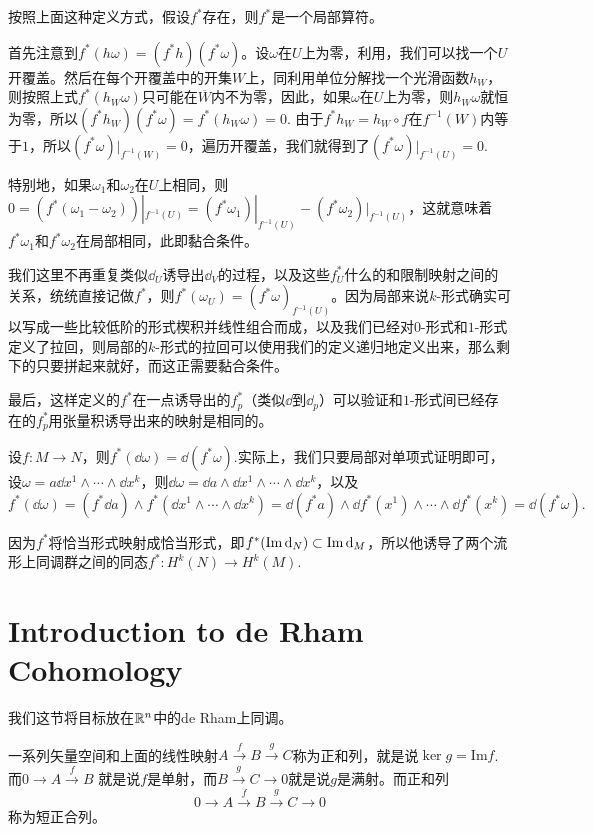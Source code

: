 \para 按照上面这种定义方式，假设$f^*$存在，则$f^*$是一个局部算符。

首先注意到$f^*(h\omega)=(f^*h)(f^*\omega)$。设$\omega$在$U$上为零，利用，我们可以找一个$U$开覆盖。然后在每个开覆盖中的开集$W$上，同利用单位分解找一个光滑函数$h_W$，则按照上式$f^*(h_W\omega)$只可能在$\overline{W}$内不为零，因此，如果$\omega$在$U$上为零，则$h_W\omega$就恒为零，所以$(f^*h_W)(f^*\omega)=f^*(h_W\omega)=0$. 由于$f^*h_W=h_W\circ f$在$f^{-1}(W)$内等于$1$，所以$(f^*\omega)|_{f^{-1}(W)}=0$，遍历开覆盖，我们就得到了$(f^*\omega)|_{f^{-1}(U)}=0$.

特别地，如果$\omega_1$和$\omega_2$在$U$上相同，则$0=(f^*(\omega_1-\omega_2))|_{f^{-1}(U)}=(f^*\omega_1)|_{f^{-1}(U)}-(f^*\omega_2)|_{f^{-1}(U)}$，这就意味着$f^*\omega_1$和$f^*\omega_2$在局部相同，此即黏合条件。

我们这里不再重复类似$\dd_U$诱导出$\dd_V$的过程，以及这些$f^*_U$什么的和限制映射之间的关系，统统直接记做$f^*$，则$f^*(\omega_{U})=(f^* \omega)_{f^{-1}(U)}$。因为局部来说$k$-形式确实可以写成一些比较低阶的形式楔积并线性组合而成，以及我们已经对$0$-形式和$1$-形式定义了拉回，则局部的$k$-形式的拉回可以使用我们的定义递归地定义出来，那么剩下的只要拼起来就好，而这正需要黏合条件。

最后，这样定义的$f^*$在一点诱导出的$f^*_p$（类似$\dd$到$\dd_p$）可以验证和$1$-形式间已经存在的$f^*_p$用张量积诱导出来的映射是相同的。

\para 设$f:M\to N$，则$f^*(\dd \omega)=\dd (f^*\omega)$.实际上，我们只要局部对单项式证明即可，设$\omega=a\dd x^{1}\wedge\cdots\wedge \dd x^{k}$，则$\dd \omega=\dd a\wedge \dd x^{1}\wedge\cdots\wedge \dd x^{k}$，以及
\[
	f^*(\dd \omega)=(f^*\dd a)\wedge f^*(\dd x^{1}\wedge\cdots\wedge \dd x^{k})=\dd (f^*a)\wedge \dd f^*(x^{1})\wedge\cdots\wedge \dd f^*(x^{k})=\dd (f^*\omega).
\]

因为$f^*$将恰当形式映射成恰当形式，即$f^*(\operatorname{Im} \mathrm{d}_N)\subset \operatorname{Im} \mathrm{d}_M$，所以他诱导了两个流形上同调群之间的同态$f^*:H^k(N)\to H^k(M)$.

\section{Introduction to de Rham Cohomology}

我们这节将目标放在$\mathbb{R}^n$中的de Rham上同调。

\para 一系列矢量空间和上面的线性映射$A\xrightarrow{f}B\xrightarrow{g}C$称为正和列，就是说$\ker g=\mathrm{Im} f$.而$0\to A\xrightarrow{f}B$
就是说$f$是单射，而$B\xrightarrow{g}C\to 0$就是说$g$是满射。而正和列
\[
0\to A\xrightarrow{f}B\xrightarrow{g}C\to 0
\]
称为短正合列。

